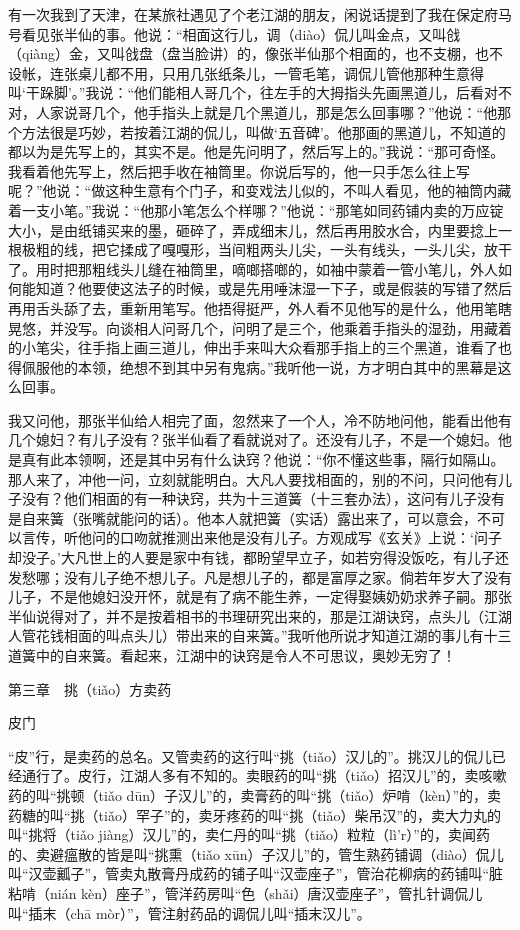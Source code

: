 \documentclass[12pt,UTF8]{ctexbook}
\begin{document}
有一次我到了天津，在某旅社遇见了个老江湖的朋友，闲说话提到了我在保定府马号看见张半仙的事。他说：“相面这行儿，调（diào）侃儿叫金点，又叫戗（qiàng）金，又叫戗盘（盘当脸讲）的，像张半仙那个相面的，也不支棚，也不设帐，连张桌儿都不用，只用几张纸条儿，一管毛笔，调侃儿管他那种生意得叫‘干跺脚’。”我说：“他们能相人哥几个，往左手的大拇指头先画黑道儿，后看对不对，人家说哥几个，他手指头上就是几个黑道儿，那是怎么回事哪？”他说：“他那个方法很是巧妙，若按着江湖的侃儿，叫做‘五音碑’。他那画的黑道儿，不知道的都以为是先写上的，其实不是。他是先问明了，然后写上的。”我说：“那可奇怪。我看着他先写上，然后把手收在袖筒里。你说后写的，他一只手怎么往上写呢？”他说：“做这种生意有个门子，和变戏法儿似的，不叫人看见，他的袖筒内藏着一支小笔。”我说：“他那小笔怎么个样哪？”他说：“那笔如同药铺内卖的万应锭大小，是由纸铺买来的墨，砸碎了，弄成细末儿，然后再用胶水合，内里要捻上一根极粗的线，把它揉成了嘎嘎形，当间粗两头儿尖，一头有线头，一头儿尖，放干了。用时把那粗线头儿缝在袖筒里，嘀啷搭啷的，如袖中蒙着一管小笔儿，外人如何能知道？他要使这法子的时候，或是先用唾沫湿一下子，或是假装的写错了然后再用舌头舔了去，重新用笔写。他捂得挺严，外人看不见他写的是什么，他用笔瞎晃悠，并没写。向谈相人问哥几个，问明了是三个，他乘着手指头的湿劲，用藏着的小笔尖，往手指上画三道儿，伸出手来叫大众看那手指上的三个黑道，谁看了也得佩服他的本领，绝想不到其中另有鬼病。”我听他一说，方才明白其中的黑幕是这么回事。

我又问他，那张半仙给人相完了面，忽然来了一个人，冷不防地问他，能看出他有几个媳妇？有儿子没有？张半仙看了看就说对了。还没有儿子，不是一个媳妇。他是真有此本领啊，还是其中另有什么诀窍？他说：“你不懂这些事，隔行如隔山。那人来了，冲他一问，立刻就能明白。大凡人要找相面的，别的不问，只问他有儿子没有？他们相面的有一种诀窍，共为十三道簧（十三套办法），这问有儿子没有是自来簧（张嘴就能问的话）。他本人就把簧（实话）露出来了，可以意会，不可以言传，听他问的口吻就推测出来他是没有儿子。方观成写《玄关》上说：‘问子却没子。’大凡世上的人要是家中有钱，都盼望早立子，如若穷得没饭吃，有儿子还发愁哪；没有儿子绝不想儿子。凡是想儿子的，都是富厚之家。倘若年岁大了没有儿子，不是他媳妇没开怀，就是有了病不能生养，一定得娶姨奶奶求养子嗣。那张半仙说得对了，并不是按着相书的书理研究出来的，那是江湖诀窍，点头儿（江湖人管花钱相面的叫点头儿）带出来的自来簧。”我听他所说才知道江湖的事儿有十三道簧中的自来簧。看起来，江湖中的诀窍是令人不可思议，奥妙无穷了！





第三章　挑（tiǎo）方卖药


皮门


“皮”行，是卖药的总名。又管卖药的这行叫“挑（tiǎo）汉儿的”。挑汉儿的侃儿已经通行了。皮行，江湖人多有不知的。卖眼药的叫“挑（tiǎo）招汉儿”的，卖咳嗽药的叫“挑顿（tiǎo dūn）子汉儿”的，卖膏药的叫“挑（tiǎo）炉啃（kèn）”的，卖药糖的叫“挑（tiǎo）罕子”的，卖牙疼药的叫“挑（tiǎo）柴吊汉”的，卖大力丸的叫“挑将（tiǎo jiàng）汉儿”的，卖仁丹的叫“挑（tiǎo）粒粒（lì’r）”的，卖闻药的、卖避瘟散的皆是叫“挑熏（tiǎo xūn）子汉儿”的，管生熟药铺调（diào）侃儿叫“汉壶瓤子”，管卖丸散膏丹成药的铺子叫“汉壶座子”，管治花柳病的药铺叫“脏粘啃（nián kèn）座子”，管洋药房叫“色（shǎi）唐汉壶座子”，管扎针调侃儿叫“插末（chā mòr）”，管注射药品的调侃儿叫“插末汉儿”。
\end{document}

